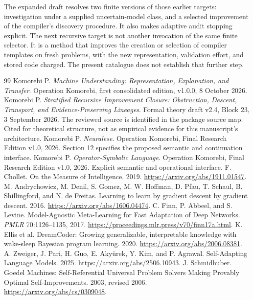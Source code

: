 \documentclass[11pt,letterpaper]{article}
\theoremstyle{plain}
\theoremstyle{definition}
\begin{document}
The expanded draft resolves two finite versions of those earlier targets: investigation under a supplied uncertain-model class, and a selected improvement of the compiler's discovery procedure. It also makes adaptive audit stopping explicit. The next recursive target is not another invocation of the same finite selector. It is a method that improves the creation or selection of compiler templates on fresh problems, with the new representation, validation effort, and stored code charged. The present catalogue does not establish that further step.

\clearpage{}
\begin{thebibliography}{99}\small
{} Komorebi P. \emph{Machine Understanding: Representation, Explanation, and Transfer}. Operation Komorebi, first consolidated edition, v1.0.0, 8 October 2026.
 Komorebi P. \emph{Stratified Recursive Improvement Closure: Obstruction, Descent, Transport, and Evidence-Preserving Lineages}. Formal theory draft v2.4, Block 23, 3 September 2026. The reviewed source is identified in the package source map. Cited for theoretical structure, not as empirical evidence for this manuscript's architecture.
 Komorebi P. \emph{Neuralese}. Operation Komorebi, Final Research Edition v1.0, 2026. Section 12 specifies the proposed semantic and continuation interface.
 Komorebi P. \emph{Operator-Symbolic Language}. Operation Komorebi, Final Research Edition v1.0, 2026. Explicit semantic and operational interface.
 F. Chollet. On the Measure of Intelligence. 2019. \url{https://arxiv.org/abs/1911.01547}.
 M. Andrychowicz, M. Denil, S. Gomez, M. W. Hoffman, D. Pfau, T. Schaul, B. Shillingford, and N. de Freitas. Learning to learn by gradient descent by gradient descent. 2016. \url{https://arxiv.org/abs/1606.04474}.
 C. Finn, P. Abbeel, and S. Levine. Model-Agnostic Meta-Learning for Fast Adaptation of Deep Networks. \emph{PMLR} 70:1126--1135, 2017. \url{https://proceedings.mlr.press/v70/finn17a.html}.
 K. Ellis et al. DreamCoder: Growing generalizable, interpretable knowledge with wake-sleep Bayesian program learning. 2020. \url{https://arxiv.org/abs/2006.08381}.
 A. Zweiger, J. Pari, H. Guo, E. Aky\"urek, Y. Kim, and P. Agrawal. Self-Adapting Language Models. 2025. \url{https://arxiv.org/abs/2506.10943}.
 J. Schmidhuber. Goedel Machines: Self-Referential Universal Problem Solvers Making Provably Optimal Self-Improvements. 2003, revised 2006. \url{https://arxiv.org/abs/cs/0309048}.

\end{thebibliography}
\end{document}
